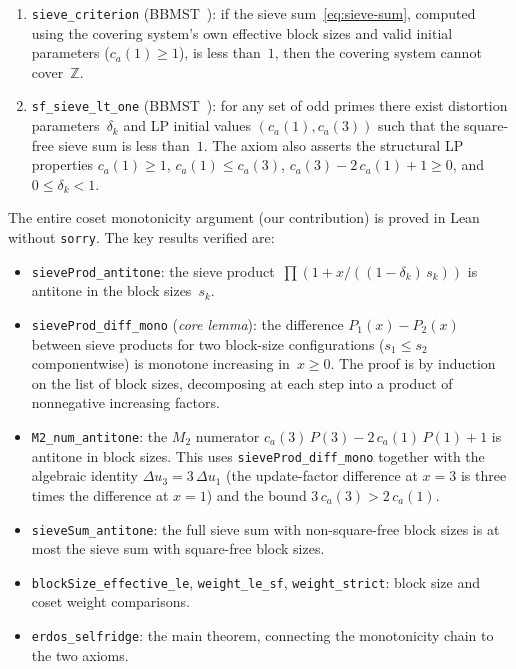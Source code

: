 \documentclass[11pt]{amsart}
\theoremstyle{definition}
\theoremstyle{remark}
\begin{document}
\begin{enumerate}
\item \texttt{sieve\_criterion}
      (BBMST~\cite[Theorems~3.1 and~3.2]{BBMST2019}):
      if the sieve sum~\eqref{eq:sieve-sum}, computed using the
      covering system's own effective block sizes and valid
      initial parameters ($c_a(1) \ge 1$), is less than~$1$,
      then the covering system cannot cover~$\mathbb{Z}$.

\item \texttt{sf\_sieve\_lt\_one}
      (BBMST~\cite[Theorem~1.1]{BBMST2019}):
      for any set of odd primes there exist distortion
      parameters~$\delta_k$ and LP initial values $(c_a(1), c_a(3))$
      such that the square-free sieve sum is less than~$1$.
      The axiom also asserts the structural LP properties
      $c_a(1) \ge 1$, $c_a(1) \le c_a(3)$,
      $c_a(3) - 2\,c_a(1) + 1 \ge 0$, and
      $0 \le \delta_k < 1$.
\end{enumerate}

\noindent
The entire coset monotonicity argument (our contribution) is
proved in Lean without \texttt{sorry}.
The key results verified are:

\begin{itemize}
\item \texttt{sieveProd\_antitone}:
      the sieve product~$\prod(1 + x/((1-\delta_k)\,s_k))$ is
      antitone in the block sizes~$s_k$.

\item \texttt{sieveProd\_diff\_mono} (\emph{core lemma}):
      the difference $P_1(x) - P_2(x)$ between sieve products for
      two block-size configurations ($s_1 \le s_2$ componentwise)
      is monotone increasing in~$x \ge 0$.
      The proof is by induction on the list of block sizes,
      decomposing at each step into a product of nonnegative
      increasing factors.

\item \texttt{M2\_num\_antitone}:
      the $M_2$ numerator $c_a(3)\,P(3) - 2\,c_a(1)\,P(1) + 1$
      is antitone in block sizes.
      This uses \texttt{sieveProd\_diff\_mono} together with
      the algebraic identity
      $\Delta u_3 = 3\,\Delta u_1$
      (the update-factor difference at $x = 3$ is three times
      the difference at $x = 1$) and the bound
      $3\,c_a(3) > 2\,c_a(1)$.

\item \texttt{sieveSum\_antitone}:
      the full sieve sum with non-square-free block sizes is
      at most the sieve sum with square-free block sizes.

\item \texttt{blockSize\_effective\_le}, \texttt{weight\_le\_sf},
      \texttt{weight\_strict}:
      block size and coset weight comparisons.

\item \texttt{erdos\_selfridge}:
      the main theorem, connecting the monotonicity chain
      to the two axioms.
\end{itemize}
\end{document}
